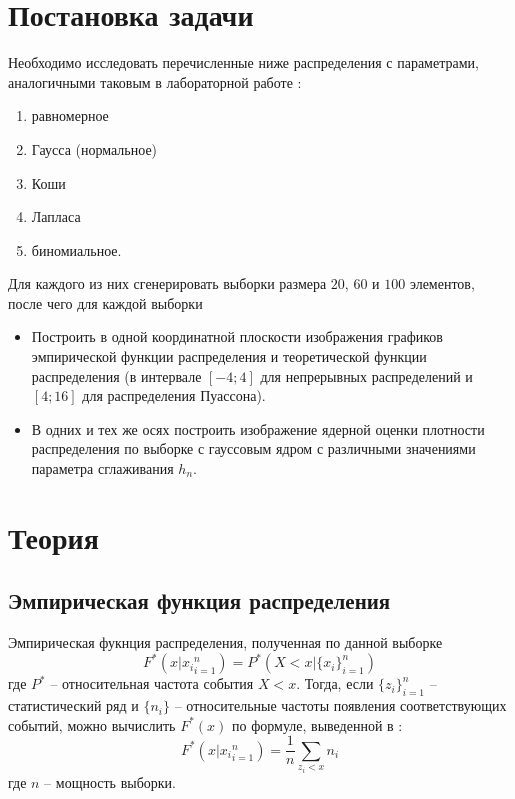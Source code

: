 \documentclass[main.tex]{subfiles}
\begin{document}
\section{Постановка задачи}
Необходимо исследовать перечисленные ниже распределения с параметрами, аналогичными таковым в лабораторной работе :
\begin{enumerate}
	\item равномерное
	\item Гаусса (нормальное)
	\item Коши
	\item Лапласа
	\item биномиальное.
\end{enumerate}
Для каждого из них сгенерировать выборки размера $20$, $60$ и $100$ элементов, после чего для каждой выборки
\begin{itemize}
	\item Построить в одной координатной плоскости изображения графиков эмпирической функции распределения и теоретической функции распределения (в интервале $[-4;4]$ для непрерывных распределений и $[4;16]$ для распределения Пуассона).
	\item В одних и тех же осях построить изображение ядерной оценки плотности распределения по выборке с гауссовым ядром с различными значениями параметра сглаживания $h_n$. 
\end{itemize}

\newpage
\section{Теория}
\subsection{Эмпирическая функция распределения}
Эмпирическая фукнция распределения, полученная по данной выборке
\begin{equation}
	F^*(x|{x_i}_{i=1}^{n}) = P^*(X < x| \{x_i\}_{i=1}^n)
\end{equation}
где $P^*$ -- относительная частота события $X < x$. Тогда, если $\{z_i\}_{i=1}^n$ -- статистический ряд и $\{n_i\}$ -- относительные частоты появления соответствующих событий, можно вычислить $F^*(x)$ по формуле, выведенной в \cite{maksimov_book}:
\begin{equation}
	F^*(x|{x_i}_{i=1}^{n}) = \frac{1}{n} \sum_{z_i < x} n_i
\end{equation}
где $n$ -- мощность выборки.
\end{document}
